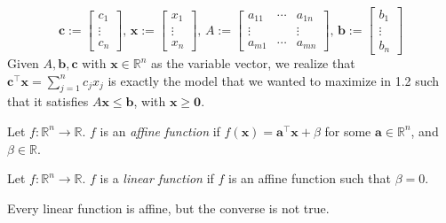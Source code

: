 \begin{remark}
    \[
        \bm{c}:=\left[\begin{array}{c}{c_{1}} \\ {\vdots} \\ {c_{n}}\end{array}\right],\,
        \bm{x}:=\left[\begin{array}{c}{x_{1}} \\ {\vdots} \\ {x_{n}}\end{array}\right],\,
        A:=\left[\begin{array}{cccc}
                {a_{11}}  & \cdots & {a_{1 n}} \\
                \vdots    &        & \vdots    \\
                {a_{m 1}} & \cdots & {a_{m n}}
            \end{array}\right]
        ,\,
        \bm{b}:=\left[\begin{array}{c}{b_{1}} \\ {\vdots} \\ {b_{n}}\end{array}\right]
    \]
    Given $A,\bm{b},\bm{c}$ with $\bm{x}\in\mathbb{R}^n$ as the variable vector, we realize that
    $\bm{c}^\top  \bm{x}=\sum\limits_{j=1}^n c_jx_j$ is exactly the model that we wanted to maximize
    in 1.2 such that it satisfies $A\bm{x}\leqslant \bm{b}$, with $\bm{x}\geqslant  \bm{0}$.
\end{remark}

\begin{defbox}
    \begin{definition}
        Let $f:\mathbb{R}^n\rightarrow\mathbb{R}$. $f$ is an \emph{affine function} if
        $f(\bm{x})=\bm{a}^\top \bm{x}+\beta$ for some $\bm{a}\in\mathbb{R}^n$, and $\beta\in\mathbb{R}$.
    \end{definition}
\end{defbox}

\begin{defbox}
    \begin{definition}
        Let $f:\mathbb{R}^n\rightarrow\mathbb{R}$. $f$ is a \emph{linear function} if
        $f$ is an affine function such that $\beta=0$.
    \end{definition}
\end{defbox}

\begin{remark}
    Every linear function is affine, but the converse is not true.
\end{remark}

